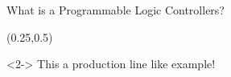\documentclass{beamer}
\begin{document}
\begin{frame}
    \begin{exampleblock}{What is a Programmable Logic Controllers?}
        \begin{figure}
        \end{figure}
        \begin{figure}
        \end{figure}
    \end{exampleblock}
    \begin{textblock*}{60mm}(0.25\textwidth,0.5\textheight)
        \begin{exampleblock}{}<2->
            This a production line like example!
        \end{exampleblock}
    \end{textblock*}
\end{frame}
\end{document}
